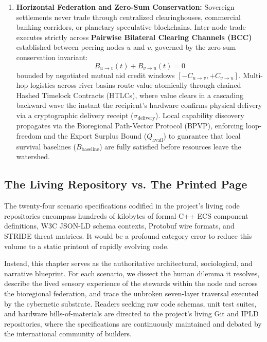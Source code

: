 \begin{enumerate}
    \item \textbf{Horizontal Federation and Zero-Sum Conservation:} Sovereign settlements never trade through centralized clearinghouses, commercial banking corridors, or planetary speculative blockchains. Inter-node trade executes strictly across \textbf{Pairwise Bilateral Clearing Channels (BCC)} established between peering nodes $u$ and $v$, governed by the zero-sum conservation invariant:
    \[
    B_{u \to v}(t) + B_{v \to u}(t) = 0
    \]
    bounded by negotiated mutual aid credit windows $[-C_{u \to v}, +C_{v \to u}]$. Multi-hop logistics across river basins route value atomically through chained Hashed Timelock Contracts (HTLCs), where value clears in a cascading backward wave the instant the recipient's hardware confirms physical delivery via a cryptographic delivery receipt ($\sigma_{\mathrm{delivery}}$). Local capability discovery propagates via the Bioregional Path-Vector Protocol (BPVP), enforcing loop-freedom and the Export Surplus Bound ($Q_{\mathrm{avail}}$) to guarantee that local survival baselines ($B_{\mathrm{baseline}}$) are fully satisfied before resources leave the watershed.
\end{enumerate}

\subsection{The Living Repository vs. The Printed Page}
The twenty-four scenario specifications codified in the project's living code repositories encompass hundreds of kilobytes of formal C++ ECS component definitions, W3C JSON-LD schema contexts, Protobuf wire formats, and STRIDE threat matrices. It would be a profound category error to reduce this volume to a static printout of rapidly evolving code. 

Instead, this chapter serves as the authoritative architectural, sociological, and narrative blueprint. For each scenario, we dissect the human dilemma it resolves, describe the lived sensory experience of the stewards within the node and across the bioregional federation, and trace the unbroken seven-layer traversal executed by the cybernetic substrate. Readers seeking raw code schemas, unit test suites, and hardware bills-of-materials are directed to the project's living Git and IPLD repositories, where the specifications are continuously maintained and debated by the international community of builders.

